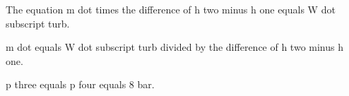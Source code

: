 The equation m dot times the difference of h two minus h one equals W dot subscript turb.

m dot equals W dot subscript turb divided by the difference of h two minus h one.

p three equals p four equals 8 bar.